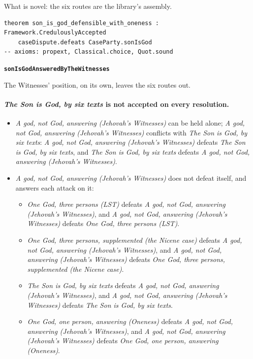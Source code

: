 \documentclass[11pt,paper=\testimonypaper,DIV=13,parskip=false]{scrartcl}
\begin{document}
What is novel: the six routes are the library’s assembly.

{\small\begin{verbatim}
theorem son_is_god_defensible_with_oneness : Framework.CredulouslyAccepted
    caseDispute.defeats CaseParty.sonIsGod
-- axioms: propext, Classical.choice, Quot.sound
\end{verbatim}}
\par\medskip\noindent\textbf{\texttt{son\allowbreak{}Is\allowbreak{}God\allowbreak{}Answered\allowbreak{}By\allowbreak{}The\allowbreak{}Witnesses}}\par\nobreak\noindent
The Witnesses’ position, on its own, leaves the six routes out.

\paragraph{\emph{The Son is God, by six texts} is not accepted on every resolution.}
\begin{itemize}
\item \emph{A god, not God, answering (Jehovah’s Witnesses)} can be held alone; \emph{A god, not God, answering (Jehovah’s Witnesses)} conflicts with \emph{The Son is God, by six texts}: \emph{A god, not God, answering (Jehovah’s Witnesses)} defeats \emph{The Son is God, by six texts}, and \emph{The Son is God, by six texts} defeats \emph{A god, not God, answering (Jehovah’s Witnesses)}.
\item \emph{A god, not God, answering (Jehovah’s Witnesses)} does not defeat itself, and answers each attack on it:
\begin{itemize}
\item \emph{One God, three persons (LST)} defeats \emph{A god, not God, answering (Jehovah’s Witnesses)}, and \emph{A god, not God, answering (Jehovah’s Witnesses)} defeats \emph{One God, three persons (LST)}.
\item \emph{One God, three persons, supplemented (the Nicene case)} defeats \emph{A god, not God, answering (Jehovah’s Witnesses)}, and \emph{A god, not God, answering (Jehovah’s Witnesses)} defeats \emph{One God, three persons, supplemented (the Nicene case)}.
\item \emph{The Son is God, by six texts} defeats \emph{A god, not God, answering (Jehovah’s Witnesses)}, and \emph{A god, not God, answering (Jehovah’s Witnesses)} defeats \emph{The Son is God, by six texts}.
\item \emph{One God, one person, answering (Oneness)} defeats \emph{A god, not God, answering (Jehovah’s Witnesses)}, and \emph{A god, not God, answering (Jehovah’s Witnesses)} defeats \emph{One God, one person, answering (Oneness)}.
\end{itemize}
\end{itemize}
\end{document}
